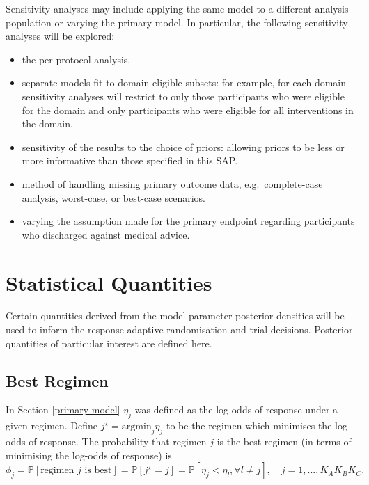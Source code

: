 \documentclass[
  11pt,
]{article}
\providecommand{\tightlist}{%
  \setlength{\itemsep}{0pt}\setlength{\parskip}{0pt}}
\begin{document}
Sensitivity analyses may include applying the same model to a different analysis population or varying the primary model.
In particular, the following sensitivity analyses will be explored:

\begin{itemize}
\tightlist
\item
  the per-protocol analysis.
\item
  separate models fit to domain eligible subsets: for example, for each domain sensitivity analyses will restrict to only those participants who were eligible for the domain and only participants who were eligible for all interventions in the domain.
\item
  sensitivity of the results to the choice of priors: allowing priors to be less or more informative than those specified in this SAP.
\item
  method of handling missing primary outcome data, e.g.~complete-case analysis, worst-case, or best-case scenarios.
\item
  varying the assumption made for the primary endpoint regarding participants who discharged against medical advice.
\end{itemize}

\hypertarget{statistical-quantities}{%
\section{Statistical Quantities}\label{statistical-quantities}}

Certain quantities derived from the model parameter posterior densities will be used to inform the response adaptive randomisation and trial decisions.
Posterior quantities of particular interest are defined here.

\hypertarget{best-regimen}{%
\subsection{Best Regimen}\label{best-regimen}}

In Section \ref{primary-model} \(\eta_j\) was defined as the log-odds of response under a given regimen. Define \(j^\star = \text{argmin}_j \eta_j\) to be the regimen which minimises the log-odds of response.
The probability that regimen \(j\) is the best regimen (in terms of minimising the log-odds of response) is
\[
\phi_j = \mathbb P[\text{regimen }j\text{ is best}] = \mathbb P[j^\star = j] = \mathbb P[\eta_j < \eta_{l}, \forall l\ne j],\quad j=1,...,K_AK_BK_C.
\]
\end{document}
